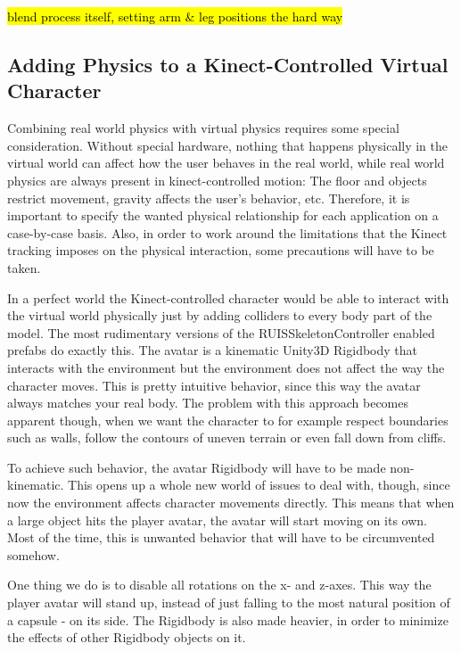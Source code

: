 \documentclass[12pt,a4paper,oneside,pdftex]{report}
\begin{document}
\hl{blend process itself, setting arm & leg positions the hard way}

\subsection{Adding Physics to a Kinect-Controlled Virtual Character}
\label{subsection:skeletontracking:physics}

Combining real world physics with virtual physics requires some special consideration. Without special hardware, nothing that happens physically in the virtual world can affect how the user behaves in the real world, while real world physics are always present in kinect-controlled motion: The floor and objects restrict movement, gravity affects the user's behavior, etc. Therefore, it is important to specify the wanted physical relationship for each application on a case-by-case basis. Also, in order to work around the limitations that the Kinect tracking imposes on the physical interaction, some precautions will have to be taken.

In a perfect world the Kinect-controlled character would be able to interact with the virtual world physically just by adding colliders to every body part of the model. The most rudimentary versions of the RUISSkeletonController enabled prefabs do exactly this. The avatar is a kinematic Unity3D Rigidbody that interacts with the environment but the environment does not affect the way the character moves. This is pretty intuitive behavior, since this way the avatar always matches your real body. The problem with this approach becomes apparent though, when we want the character to for example respect boundaries such as walls, follow the contours of uneven terrain or even fall down from cliffs.

To achieve such behavior, the avatar Rigidbody will have to be made non-kinematic. This opens up a whole new world of issues to deal with, though, since now the environment affects character movements directly. This means that when a large object hits the player avatar, the avatar will start moving on its own. Most of the time, this is unwanted behavior that will have to be circumvented somehow.

One thing we do is to disable all rotations on the x- and z-axes. This way the player avatar will stand up, instead of just falling to the most natural position of a capsule - on its side. The Rigidbody is also made heavier, in order to minimize the effects of other Rigidbody objects on it.
\end{document}
